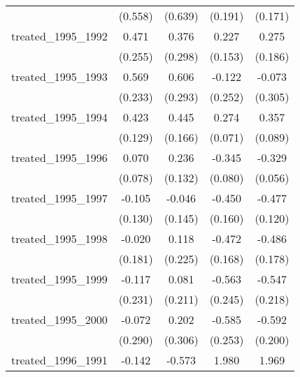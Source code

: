 {\begin{tabular}{l*{4}{c}}
            &     (0.558)         &     (0.639)         &     (0.191)         &     (0.171)         \\
[1em]
treated\_1995\_1992&       0.471         &       0.376         &       0.227         &       0.275         \\
            &     (0.255)         &     (0.298)         &     (0.153)         &     (0.186)         \\
[1em]
treated\_1995\_1993&       0.569\sym{*}  &       0.606\sym{*}  &      -0.122         &      -0.073         \\
            &     (0.233)         &     (0.293)         &     (0.252)         &     (0.305)         \\
[1em]
treated\_1995\_1994&       0.423\sym{**} &       0.445\sym{**} &       0.274\sym{***}&       0.357\sym{***}\\
            &     (0.129)         &     (0.166)         &     (0.071)         &     (0.089)         \\
[1em]
treated\_1995\_1996&       0.070         &       0.236         &      -0.345\sym{***}&      -0.329\sym{***}\\
            &     (0.078)         &     (0.132)         &     (0.080)         &     (0.056)         \\
[1em]
treated\_1995\_1997&      -0.105         &      -0.046         &      -0.450\sym{**} &      -0.477\sym{***}\\
            &     (0.130)         &     (0.145)         &     (0.160)         &     (0.120)         \\
[1em]
treated\_1995\_1998&      -0.020         &       0.118         &      -0.472\sym{**} &      -0.486\sym{**} \\
            &     (0.181)         &     (0.225)         &     (0.168)         &     (0.178)         \\
[1em]
treated\_1995\_1999&      -0.117         &       0.081         &      -0.563\sym{*}  &      -0.547\sym{*}  \\
            &     (0.231)         &     (0.211)         &     (0.245)         &     (0.218)         \\
[1em]
treated\_1995\_2000&      -0.072         &       0.202         &      -0.585\sym{*}  &      -0.592\sym{**} \\
            &     (0.290)         &     (0.306)         &     (0.253)         &     (0.200)         \\
[1em]
treated\_1996\_1991&      -0.142         &      -0.573         &       1.980\sym{***}&       1.969\sym{***}\\

\end{tabular}}
